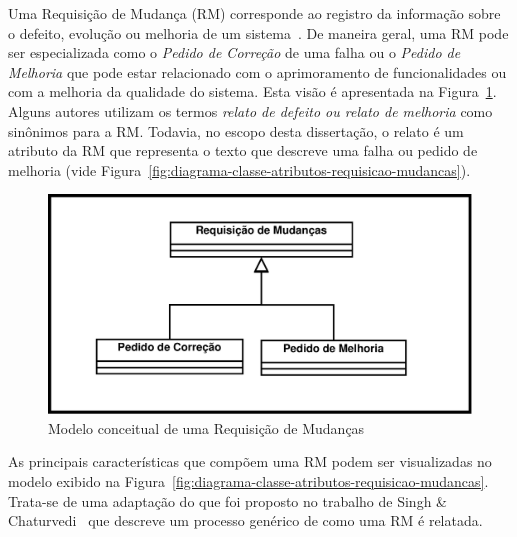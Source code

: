 

Uma Requisição de Mudança (RM) corresponde ao registro da informação sobre o
defeito, evolução ou melhoria de um sistema~\cite{tripathy2014software}. De
maneira geral, uma RM pode ser especializada como o \textit{Pedido de Correção}
de uma falha ou o \textit{Pedido de Melhoria} que pode estar relacionado com o
aprimoramento de funcionalidades ou com a melhoria da qualidade do sistema. Esta
visão é apresentada na Figura~\ref{fig:diagrama-classe-requisicao-mudancas}.
Alguns autores utilizam os termos \textit{relato de defeito ou relato de
    melhoria} como sinônimos para a RM\@. Todavia, no escopo desta dissertação,
o relato é um atributo da RM que representa o texto que descreve uma falha ou
pedido de melhoria (vide
Figura~\ref{fig:diagrama-classe-atributos-requisicao-mudancas}).

\begin{figure}[htpb]
	\centering
	\includegraphics[width=0.5\linewidth]{./chapter-manutencao-software-visao-geral/img/diagrama-classe-conceitual-requisicao-mudancas.pdf}
	\caption{Modelo conceitual de uma Requisição de Mudanças}
\label{fig:diagrama-classe-requisicao-mudancas}
\end{figure}

As principais características que compõem uma RM podem ser visualizadas no
modelo exibido na
Figura~\ref{fig:diagrama-classe-atributos-requisicao-mudancas}. Trata-se de uma
adaptação do que foi proposto no trabalho de Singh \&
Chaturvedi~\cite{singh2011bug} que descreve um processo genérico de como uma RM
é relatada.

